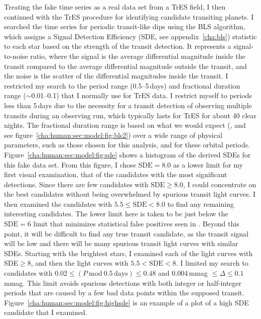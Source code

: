 Treating the fake time series as a real data set from a TrES field, I then continued with the TrES procedure for identifying candidate transiting planets.
I searched the time series for periodic transit-like dips using the BLS algorithm, which assigns a Signal Detection Efficiency (SDE, see appendix~\ref{cha:bls}) statistic to each star based on the strength of the transit detection. 
It represents a signal-to-noise ratio, where the signal is the average differential magnitude inside the transit compared to the average differential magnitude outside the transit, and the noise is the scatter of the differential magnitudes inside the transit.
I restricted my search to the period range (0.5--5\,days) and fractional duration range ($\sim$0.01--0.1) that I normally use for TrES data. 
I restrict myself to periods less than 5\,days due to the necessity for a transit detection of observing multiple transits during an observing run, which typically lasts for TrES for about 40 clear nights. 
The fractional duration range is based on what we would expect (\citealp*{Defay_Deleuil_Barge:aa:2001a}, and see figure~\ref{cha:human:sec:model:fig:bls2}) over a wide range of physical parameters, such as those chosen for this analysis, and for these orbital periods. Figure~\ref{cha:human:sec:model:fig:sde} shows a histogram of the derived SDEs for this fake data set.
From this figure, I chose $\mathrm{SDE}=8.0$ as a lower limit for my first visual examination, that of the candidates with the most significant detections.
Since there are few candidates with $\mathrm{SDE}\geq8.0$, I could concentrate on the best candidates without being overwhelmed by spurious transit light curves.
I then examined the candidates with $5.5 \leq \mathrm{SDE} < 8.0$ to find any remaining interesting candidates.
The lower limit here is taken to be just below the $\mathrm{SDE}=6$ limit that minimizes statistical false positives seen in \citet{Kovacs_Zucker_Mazeh:aa:2002a}.  
Beyond this point, it will be difficult to find any true transit candidate, as the transit signal will be low and there will be many spurious transit light curves with similar SDEs.
Starting with the brightest stars, I examined each of the light curves with SDE$\geq8$, and then the light curves with $5.5<\mathrm{SDE}<8$.
I limited my search to candidates with $0.02 \leq (P\ \mathrm{mod}\ 0.5\,\mathrm{days})\leq 0.48$ and 0.004\,mmag $\leq \Delta \leq 0.1$\,mmag. 
This limit avoids spurious detections with both integer or half-integer periods that are caused by a few bad data points within the supposed transit. Figure~\ref{cha:human:sec:model:fig:highsde} is an example of a plot of a high SDE candidate that I examined.

